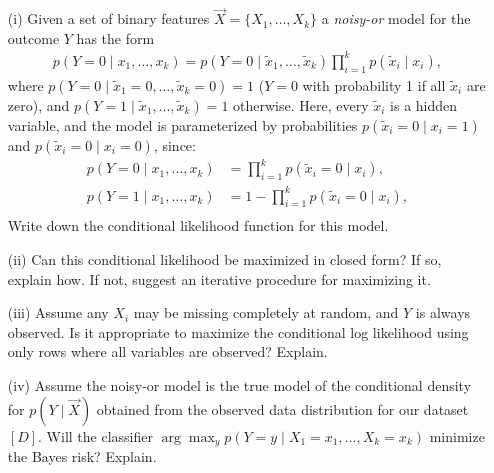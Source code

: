 \documentclass[11pt]{article}
\begin{document}
\begin{itemize}

\item[(i)] Given a set of binary features $\vec{X} = \{ X_1, \ldots, X_k \}$ a \emph{noisy-or} model for the outcome $Y$ has the form
{\small
\begin{align*}
p(Y = 0 \mid x_1, \ldots, x_k) = p(Y = 0 \mid \tilde{x}_1, \ldots, \tilde{x}_k) \prod_{i=1}^k p(\tilde{x}_i \mid x_i),
\end{align*}
}
where $p(Y = 0 \mid \tilde{x}_1 = 0, \ldots, \tilde{x}_k = 0) = 1$ ($Y = 0$ with probability 1 if all $\tilde{x}_i$ are zero), and $p(Y = 1 \mid \tilde{x}_1, \ldots, \tilde{x}_k) = 1$ otherwise.
Here, every $\tilde{x}_i$ is a hidden variable, and the model is parameterized by probabilities $p(\tilde{x}_i = 0 \mid x_i = 1)$ and $p(\tilde{x}_i = 0 \mid x_i = 0)$, since:
{\small
\begin{align*}
p(Y = 0 \mid x_1, \ldots, x_k) &= \prod_{i=1}^k p(\tilde{x}_i = 0 \mid x_i),\\
p(Y = 1 \mid x_1, \ldots, x_k) &= 1 - \prod_{i=1}^k p(\tilde{x}_i = 0 \mid x_i),\\
\end{align*}
}
Write down the conditional likelihood function for this model.


\vspace{0.5cm}

\item[(ii)] Can this conditional likelihood be maximized in closed form?  If so, explain how.  If not, suggest an iterative procedure for maximizing it.


\pagebreak

\item[(iii)] Assume any $X_i$ may be missing completely at random, and $Y$ is always observed.  Is it appropriate to maximize the conditional log likelihood using only rows where all variables are observed?  Explain.


\vspace{0.5cm}

\item[(iv)] Assume the noisy-or model is the true model of the conditional density for $p(Y \mid \vec{X})$ obtained from the observed data distribution for our dataset $[D]$.
Will the classifier $\arg\max_y p(Y = y \mid X_1 = x_1, \ldots, X_k = x_k)$ minimize the Bayes risk?  Explain.


\vspace{0.5cm}

\end{itemize}
\end{document}
